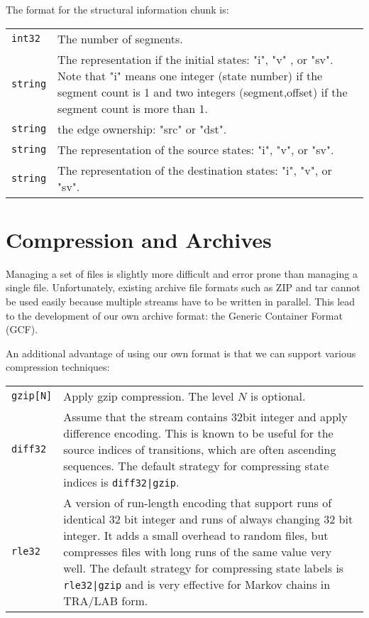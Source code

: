 \documentclass{article}
\theoremstyle{plain}
\begin{document}
The format for the structural information chunk is:
\par\noindent\begin{tabularx}{\textwidth}{lX}
{\tt int32} & The number of segments.
\\
{\tt string} & The representation if the initial states: "i", "v" , or "sv".
Note that "i" means one integer (state number) if the segment count is 1 and two integers
(segment,offset) if the segment count is more than 1.
\\
{\tt string} & the edge ownership: "src" or "dst".
\\
{\tt string} & The representation of the source states: "i", "v", or "sv".
\\
{\tt string} & The representation of the destination states: "i", "v", or "sv".
\end{tabularx}

\section{Compression and Archives}

Managing a set of files is slightly more difficult and error prone than managing a single file.
Unfortunately, existing archive file formats such as ZIP and tar cannot be used easily
because multiple streams have to be written in parallel. This lead to the development of
our own archive format: the Generic Container Format (GCF).

An additional advantage of using our own format is that we can support various compression
techniques:
\\
\begin{tabularx}{\textwidth}{lX}
{\tt gzip[N]} & Apply gzip compression. The level $N$ is optional.
\\
{\tt diff32} & Assume that the stream contains 32bit integer and apply difference encoding.
This is known to be useful for the source indices of transitions, which are often ascending sequences.
The default strategy for compressing state indices is {\tt diff32|gzip}.
\\
{\tt rle32} & A version of run-length encoding that support runs of identical 32 bit integer
and runs of always changing 32 bit integer. It adds a small overhead to random files,
but compresses files with long runs of the same value very well.
The default strategy for compressing state labels is {\tt rle32|gzip} and is very effective
for Markov chains in TRA/LAB form.
\end{tabularx}
\end{document}
